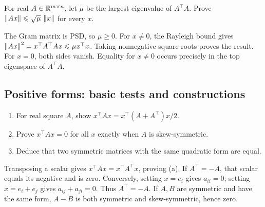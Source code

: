 \begin{problem}\label{ex:09:norm-bound}
For real \(A\in\mathbb R^{m\times n}\), let \(\mu\) be the largest eigenvalue
of \(A^\top A\). Prove \(\left\lVert Ax\right\rVert\leqslant\sqrt\mu\,\left\lVert x\right\rVert\) for
every \(x\).
\end{problem}
\begin{solution}
The Gram matrix is PSD, so \(\mu\geqslant0\).
For \(x\ne0\), the Rayleigh bound gives
\(\left\lVert Ax\right\rVert^2=x^\top A^\top Ax\leqslant\mu x^\top x\).
Taking nonnegative square roots proves the result.
For \(x=0\), both sides vanish. Equality for \(x\ne0\) occurs precisely
in the top eigenspace of \(A^\top A\).
\end{solution}

\subsection*{Positive forms: basic tests and constructions}

\begin{problem}\label{ex:09:quadratic-uniqueness}
\begin{enumerate}
\item For real square \(A\), show
\(x^\top Ax=x^\top(A+A^\top)x/2\).
\item Prove \(x^\top Ax=0\) for all \(x\) exactly when \(A\) is skew-symmetric.
\item Deduce that two symmetric matrices with the same quadratic form
are equal.
\end{enumerate}
\end{problem}
\begin{solution}
Transposing a scalar gives \(x^\top Ax=x^\top A^\top x\), proving (a).
If \(A^\top=-A\), that scalar equals its negative and is zero.
Conversely, setting \(x=e_i\) gives \(a_{ii}=0\);
setting \(x=e_i+e_j\) gives \(a_{ij}+a_{ji}=0\).
Thus \(A^\top=-A\).
If \(A,B\) are symmetric and have the same form, \(A-B\) is both
symmetric and skew-symmetric, hence zero.
\end{solution}

